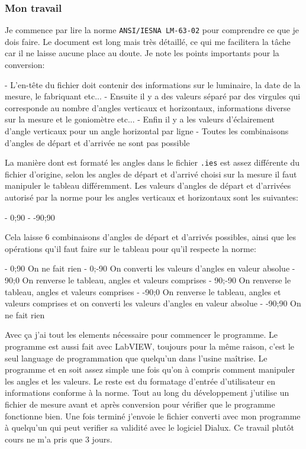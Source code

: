 \documentclass[a4paper, 12pt]{article}
\begin{document}
\subsubsection{ Mon travail  }   

Je commence par lire la norme \verb|ANSI/IESNA LM-63-02| pour comprendre ce que je dois faire.
Le document est long mais très détaillé, ce qui me facilitera la tâche car il ne laisse aucune place au doute.  
Je note les points importants pour la conversion:

- L'en-tête du fichier doit contenir des informations sur le luminaire, la date de la mesure, le fabriquant etc...
- Ensuite il y a des valeurs séparé par des virgules qui corresponde au nombre d'angles verticaux et horizontaux, informations diverse sur la mesure et le goniomètre etc...
- Enfin il y a les valeurs d'éclairement d'angle verticaux pour un angle horizontal par ligne
- Toutes les combinaisons d'angles de départ et d'arrivée ne sont pas possible

La manière dont est formaté les angles dans le fichier \verb|.ies| est assez différente du fichier d'origine, selon les angles de départ et d'arrivé choisi sur la mesure il faut manipuler le tableau différemment.  
Les valeurs d'angles de départ et d'arrivées autorisé par la norme pour les angles verticaux et horizontaux sont les suivantes:

- 0;90
- -90;90

Cela laisse 6 combinaisons d'angles de départ et d'arrivés possibles, ainsi que les opérations qu'il faut faire sur le tableau pour qu'il respecte la norme: 

- 0;90 On ne fait rien
- 0;-90 On converti les valeurs d'angles en valeur absolue
- 90;0 On renverse le tableau, angles et valeurs comprises
- 90;-90 On renverse le tableau, angles et valeurs comprises
- -90;0 On renverse le tableau, angles et valeurs comprises et on converti les valeurs d'angles en valeur absolue
- -90;90 On ne fait rien

Avec ça j'ai tout les elements nécessaire pour commencer le programme.  
Le programme est aussi fait avec LabVIEW, toujours pour la même raison, c'est le seul language de programmation que quelqu'un dans l'usine maîtrise.  
Le programme et en soit assez simple une fois qu'on à compris comment manipuler les angles et les valeurs.
Le reste est du formatage d'entrée d'utilisateur en informations conforme à la norme. 
Tout au long du développement j'utilise un fichier de mesure avant et après conversion pour vérifier que le programme fonctionne bien.
Une fois terminé j'envoie le fichier converti avec mon programme à quelqu'un qui peut verifier sa validité avec le logiciel Dialux.  
Ce travail plutôt cours ne m'a pris que 3 jours.
\end{document}
